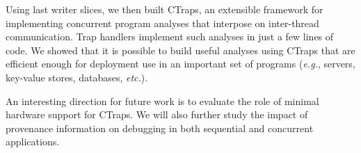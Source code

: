 \documentclass[preprint,9pt]{sigplanconf}
\newcommand{\ctraps}{CTraps\xspace}
\begin{document}
Using last writer slices, we then built \ctraps, an extensible framework for
implementing concurrent program analyses that interpose on inter-thread
communication.  Trap handlers implement such analyses in just a few lines of
code.  We showed that it is possible to build useful analyses using \ctraps
that are efficient enough for deployment use in an important set of programs
({\em e.g.}, servers, key-value stores, databases, {\em etc.}).  


An interesting direction for future work is to evaluate the role of minimal
hardware support for \ctraps.  We will also further study the impact of
provenance information on debugging in both sequential and concurrent
applications. 




{}

\end{document}
